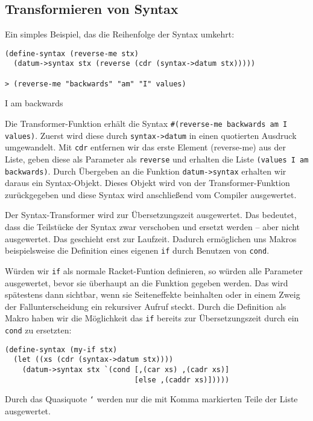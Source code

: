 \subsection{Transformieren von Syntax}

Ein simples Beispiel, das die Reihenfolge der Syntax umkehrt:

\begin{lstlisting}
(define-syntax (reverse-me stx)
  (datum->syntax stx (reverse (cdr (syntax->datum stx)))))
  
> (reverse-me "backwards" "am" "I" values)
\end{lstlisting}
{\routput {\qq}I{\qq} {\qq}am{\qq} {\qq}backwards{\qq}}

Die Transformer-Funktion erhält die Syntax \texttt{\#\q(reverse-me {\qq}backwards{\qq} {\qq}am{\qq} {\qq}I{\qq} values)}. Zuerst wird diese durch \texttt{syntax->datum} in einen quotierten Ausdruck umgewandelt. Mit \texttt{cdr} entfernen wir das erste Element (reverse-me) aus der Liste, geben diese als Parameter als \texttt{reverse} und erhalten die Liste \texttt{\q(values {\qq}I{\qq} {\qq}am{\qq} {\qq}backwards{\qq})}. Durch Übergeben an die Funktion \texttt{datum->syntax} erhalten wir daraus ein Syntax-Objekt. Dieses Objekt wird von der Transformer-Funktion zurückgegeben und diese Syntax wird anschließend vom Compiler ausgewertet.

Der Syntax-Transformer wird zur Übersetzungszeit ausgewertet. Das bedeutet, dass die Teilstücke der Syntax zwar verschoben und ersetzt werden -- aber nicht ausgewertet. Das geschieht erst zur Laufzeit. Dadurch ermöglichen uns Makros beispielsweise die Definition eines eigenen \texttt{if} durch Benutzen von \texttt{cond}.

Würden wir \texttt{if} als normale Racket-Funtion definieren, so würden alle Parameter ausgewertet, bevor sie überhaupt an die Funktion gegeben werden. Das wird spätestens dann sichtbar, wenn sie Seiteneffekte beinhalten oder in einem Zweig der Fallunterscheidung ein rekursiver Aufruf steckt. Durch die Definition als Makro haben wir die Möglichkeit das \texttt{if} bereits zur Übersetzungszeit durch ein \texttt{cond} zu ersetzten:

\begin{lstlisting}
(define-syntax (my-if stx)
  (let ((xs (cdr (syntax->datum stx))))
    (datum->syntax stx `(cond [,(car xs) ,(cadr xs)]
                              [else ,(caddr xs)]))))
\end{lstlisting}

Durch das Quasiquote \texttt{`} werden nur die mit Komma markierten Teile der Liste ausgewertet.


